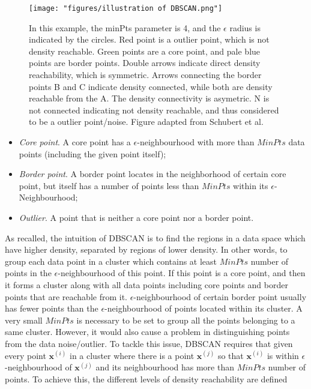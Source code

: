 \begin{figure}[tbp]
	\centering
	\texttt{[image: "figures/illustration of 
		DBSCAN.png"]}
	\caption{In this example, the minPts parameter is 4, and the $\epsilon$ 
		radius is indicated by the circles. Red point is a outlier point, which 
		is 
		not density reachable. Green points are a core point, and pale blue 
		points 
		are border points. Double arrows indicate direct density reachability, 
		which is symmetric. Arrows connecting the border points B and C 
		indicate 
		density connected, while both are density reachable from the A. The 
		density 
		connectivity is asymetric. N is not connected indicating not density 
		reachable, and thus considered to be a outlier point/noise. Figure adapted from 
		Schubert et al. 
		\cite{schubert2017dbscan}
	}
	\label{fig:relation}
\end{figure}



\begin{itemize}


\item\textit{Core point}. A core point has a $\epsilon$-neighbourhood with more than $MinPts$ data points (including the given point itself); 

\item\textit{Border point}. A border point locates in the neighborhood of certain core point, but itself has a number of points less than $MinPts$ within its $\epsilon$-Neighbourhood;


\item\textit{Outlier}. A point that is neither a core point nor a 
border point. 
	
\end{itemize}

As recalled, the intuition of DBSCAN is to find the regions in a data space 
which have higher density, separated by regions of lower density. In other 
words, to group each data point in a cluster which contains at least $MinPts$ 
number of points in the $\epsilon$-neighbourhood of this point. If this point is a core point, and then it forms a cluster along with all data points including core points and border points that are reachable from it. $\epsilon$-neighbourhood of certain border point usually has fewer points than the 
$\epsilon$-neighbourhood of points located within its cluster. A very small 
$MinPts$ is necessary to be set to group all the points belonging to a same 
cluster. However, it would also cause a problem in distinguishing points from 
the data noise/outlier. To tackle this issue, DBSCAN requires that given every 
point $\mathbf{x}^{(i)}$ in a cluster where there is a point $\mathbf{x}^{(j)}$ so 
that $\mathbf{x}^{(i)}$ is within $\epsilon$-neighbourhood of $\mathbf{x}^{(j)}$ 
and its neighbourhood has more than $MinPts$ number of points. To achieve this, 
the different levels of density reachability are defined \cite{ester1996density}


